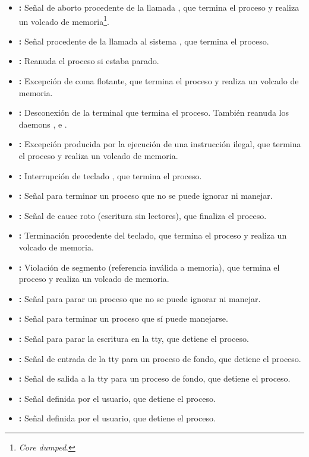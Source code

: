 \begin{itemize}
\item{}\textbf{:} Señal de aborto procedente de la llamada , que termina el proceso y realiza un volcado de memoria\footnote{\emph{Core dumped}.}.
\item{}\textbf{:} Señal procedente de la llamada al sistema , que termina el proceso.
\item{}\textbf{:} Reanuda el proceso si estaba parado.
\item{}\textbf{:} Excepción de coma flotante, que termina el proceso y realiza un volcado de memoria.
\item{}\textbf{:} Desconexión de la terminal que termina el proceso. También reanuda los daemons ,  e .
\item{}\textbf{:} Excepción producida por la ejecución de una instrucción ilegal, que termina el proceso y realiza un volcado de memoria.
\item{}\textbf{:} Interrupción de teclado , que termina el proceso.
\item{}\textbf{:} Señal para terminar un proceso que no se puede ignorar ni manejar.
\item{}\textbf{:} Señal de cauce roto (escritura sin lectores), que finaliza el proceso.
\item{}\textbf{:} Terminación procedente del teclado, que termina el proceso y realiza un volcado de memoria.
\item{}\textbf{:} Violación de segmento (referencia inválida a memoria), que termina el proceso y realiza un volcado de memoria.
\item{}\textbf{:} Señal para parar un proceso que no se puede ignorar ni manejar.
\item{}\textbf{:} Señal para terminar un proceso que sí puede manejarse.
\item{}\textbf{:} Señal para parar la escritura en la tty, que detiene el proceso.
\item{}\textbf{:} Señal de entrada de la tty para un proceso de fondo, que detiene el proceso.
\item{}\textbf{:} Señal de salida a la tty para un proceso de fondo, que detiene el proceso.
\item{}\textbf{:} Señal definida por el usuario, que detiene el proceso.
\item{}\textbf{:} Señal definida por el usuario, que detiene el proceso.
\end{itemize}

